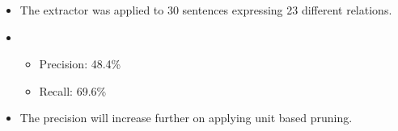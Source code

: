 \documentclass{beamer}
\begin{document}
\begin{frame}
\begin{itemize}
\item The extractor was applied to 30 sentences expressing 23 different relations. \\

\item {}

 \begin{itemize}
  \item Precision: 48.4\%
  \item Recall: 69.6\%
 \end{itemize}

\item The precision will increase further on applying unit based pruning.	
\end{itemize}

\end{frame}
\end{document}
